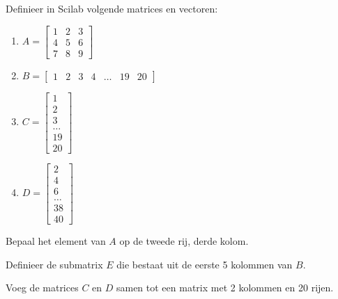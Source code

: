\begin{oef}
Definieer in Scilab volgende matrices en vectoren:
\begin{enumerate}
\item $\displaystyle 
	A=\begin{bmatrix}1&2&3\\4&5&6\\7&8&9\end{bmatrix}$
\item $B=\begin{bmatrix}1&2&3&4&\ldots&19&20\end{bmatrix}$
\item $C=\begin{bmatrix}1\\2\\3\\ \ldots \\19\\20\end{bmatrix}$
\item $D=\begin{bmatrix}2\\4\\6\\\ldots\\38\\40\end{bmatrix}$
\end{enumerate}
\end{oef}


\begin{oef}
Bepaal het element van $A$ op de tweede rij, derde kolom.
\end{oef}
\begin{oef}
Definieer de submatrix $E$ die bestaat uit de eerste 5 kolommen van $B$.
\end{oef}
\begin{oef}
Voeg de matrices $C$ en $D$ samen tot een matrix met 2 kolommen en 20 rijen.
\end{oef}

